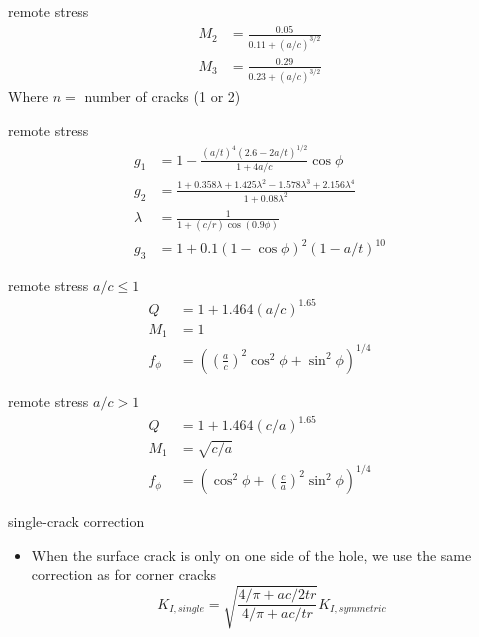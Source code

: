 \documentclass[
  letterpaper,
  ignorenonframetext,
  aspectratio=43,
  handout,
  12pt]{beamer}
\providecommand{\tightlist}{%
  \setlength{\itemsep}{0pt}\setlength{\parskip}{0pt}}
\providecommand{\tightlist}{%
\setlength{\itemsep}{0pt}\setlength{\parskip}{0pt}}
\begin{document}
\begin{frame}{remote stress}
\protect\hypertarget{remote-stress-4}{}
\[\begin{aligned}
  M_2 &= \frac{0.05}{0.11 + (a/c)^{3/2}}\\
  M_3 &= \frac{0.29}{0.23 + (a/c)^{3/2}}
\end{aligned}\] Where \(n =\) number of cracks (1 or 2)
\end{frame}

\begin{frame}{remote stress}
\protect\hypertarget{remote-stress-5}{}
\[\begin{aligned}
  g_1 &= 1- \frac{(a/t)^4(2.6-2a/t)^{1/2}}{1+4a/c}\cos \phi\\
  g_2 &= \frac{1+0.358\lambda+1.425\lambda^2 - 1.578\lambda^3+2.156\lambda^4}{1+0.08\lambda^2}\\
  \lambda &= \frac{1}{1+(c/r)\cos \left(0.9 \phi \right)}\\
  g_3 &= 1+0.1(1-\cos \phi)^2 (1-a/t)^{10}
\end{aligned}\]
\end{frame}

\begin{frame}{remote stress \(a/c \le 1\)}
\protect\hypertarget{remote-stress-ac-le-1}{}
\[\begin{aligned}
  Q &= 1 + 1.464(a/c)^{1.65}\\
  M_1 &= 1\\
  f_\phi &= \left(\left(\frac{a}{c}\right)^2 \cos^2 \phi + \sin^2 \phi \right)^{1/4}
\end{aligned}\]
\end{frame}

\begin{frame}{remote stress \(a/c > 1\)}
\protect\hypertarget{remote-stress-ac-1}{}
\[\begin{aligned}
  Q &= 1 + 1.464(c/a)^{1.65}\\
  M_1 &= \sqrt{c/a}\\
  f_\phi &= \left(\cos^2 \phi + \left(\frac{c}{a}\right)^2 \sin^2 \phi \right)^{1/4}
\end{aligned}\]
\end{frame}

\begin{frame}{single-crack correction}
\protect\hypertarget{single-crack-correction}{}
\begin{itemize}
\tightlist
\item
  When the surface crack is only on one side of the hole, we use the
  same correction as for corner cracks
  \[K_{I,single} = \sqrt{\frac{4/\pi + ac/2tr}{4/\pi + ac/tr}}K_{I,symmetric}\]
\end{itemize}
\end{frame}
\end{document}
